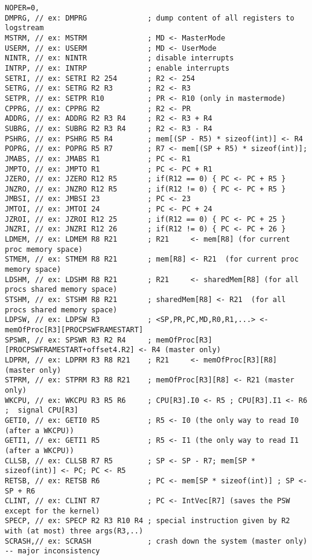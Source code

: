 \documentclass{article}
\begin{document}
\begin{itemize}
\begin{verbatim}
NOPER=0,
DMPRG, // ex: DMPRG              ; dump content of all registers to logstream
MSTRM, // ex: MSTRM              ; MD <- MasterMode
USERM, // ex: USERM              ; MD <- UserMode
NINTR, // ex: NINTR              ; disable interrupts
INTRP, // ex: INTRP              ; enable interrupts
SETRI, // ex: SETRI R2 254       ; R2 <- 254
SETRG, // ex: SETRG R2 R3        ; R2 <- R3
SETPR, // ex: SETPR R10          ; PR <- R10 (only in mastermode)
CPPRG, // ex: CPPRG R2           ; R2 <- PR  
ADDRG, // ex: ADDRG R2 R3 R4     ; R2 <- R3 + R4  
SUBRG, // ex: SUBRG R2 R3 R4     ; R2 <- R3 - R4  
PSHRG, // ex: PSHRG R5 R4        ; mem[(SP - R5) * sizeof(int)] <- R4
POPRG, // ex: POPRG R5 R7        ; R7 <- mem[(SP + R5) * sizeof(int)];
JMABS, // ex: JMABS R1           ; PC <- R1 
JMPTO, // ex: JMPTO R1           ; PC <- PC + R1 
JZERO, // ex: JZERO R12 R5       ; if(R12 == 0) { PC <- PC + R5 }
JNZRO, // ex: JNZRO R12 R5       ; if(R12 != 0) { PC <- PC + R5 }
JMBSI, // ex: JMBSI 23           ; PC <- 23 
JMTOI, // ex: JMTOI 24           ; PC <- PC + 24 
JZROI, // ex: JZROI R12 25       ; if(R12 == 0) { PC <- PC + 25 }
JNZRI, // ex: JNZRI R12 26       ; if(R12 != 0) { PC <- PC + 26 }
LDMEM, // ex: LDMEM R8 R21       ; R21     <- mem[R8] (for current proc memory space)
STMEM, // ex: STMEM R8 R21       ; mem[R8] <- R21  (for current proc memory space)
LDSHM, // ex: LDSHM R8 R21       ; R21     <- sharedMem[R8] (for all procs shared memory space)
STSHM, // ex: STSHM R8 R21       ; sharedMem[R8] <- R21  (for all procs shared memory space)
LDPSW, // ex: LDPSW R3           ; <SP,PR,PC,MD,R0,R1,...> <- memOfProc[R3][PROCPSWFRAMESTART]
SPSWR, // ex: SPSWR R3 R2 R4     ; memOfProc[R3][PROCPSWFRAMESTART+offset4.R2] <- R4 (master only)
LDPRM, // ex: LDPRM R3 R8 R21    ; R21     <- memOfProc[R3][R8] (master only)
STPRM, // ex: STPRM R3 R8 R21    ; memOfProc[R3][R8] <- R21 (master only)
WKCPU, // ex: WKCPU R3 R5 R6     ; CPU[R3].I0 <- R5 ; CPU[R3].I1 <- R6 ;  signal CPU[R3]
GETI0, // ex: GETI0 R5           ; R5 <- I0 (the only way to read I0 (after a WKCPU))
GETI1, // ex: GETI1 R5           ; R5 <- I1 (the only way to read I1 (after a WKCPU))
CLLSB, // ex: CLLSB R7 R5        ; SP <- SP - R7; mem[SP * sizeof(int)] <- PC; PC <- R5
RETSB, // ex: RETSB R6           ; PC <- mem[SP * sizeof(int)] ; SP <- SP + R6
CLINT, // ex: CLINT R7           ; PC <- IntVec[R7] (saves the PSW except for the kernel)
SPECP, // ex: SPECP R2 R3 R10 R4 ; special instruction given by R2 with (at most) three args(R3,..)
SCRASH,// ex: SCRASH             ; crash down the system (master only) -- major inconsistency 

\end{verbatim}
\end{itemize}
\end{document}
